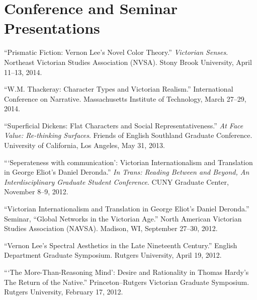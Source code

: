 \documentclass[10pt,letterpaper]{article}
\renewenvironment{itemize}{
  \begin{list}{}{
    \setlength{\leftmargin}{1.5em}
    \setlength{\itemsep}{0.25em}
    \setlength{\parskip}{0pt}
    \setlength{\parsep}{0.25em}
  }
}{
  \end{list}
}
\begin{document}



\section*{Conference and Seminar Presentations}

\begin{itemize}

\item ``Prismatic Fiction: Vernon Lee's Novel Color Theory.'' \emph{Victorian Senses}. Northeast Victorian Studies Association (NVSA). Stony Brook University, April 11--13, 2014.
\item ``W.M. Thackeray: Character Types and Victorian Realism.'' International Conference on Narrative. Massachusetts Institute of Technology, March 27--29, 2014.
\item ``Superficial Dickens: Flat Characters and Social Representativeness.'' \emph{At Face Value: Re-thinking Surfaces}. Friends of English Southland Graduate Conference. University of California, Los Angeles, May 31, 2013.
\item ```Seperateness with communication': Victorian Internationalism and Translation in George Eliot's Daniel Deronda.'' \emph{In Trans: Reading Between and Beyond, An Interdisciplinary Graduate Student Conference}. CUNY Graduate Center, November 8--9, 2012.
\item ``Victorian Internationalism and Translation in George Eliot's Daniel Deronda.'' Seminar, ``Global Networks in the Victorian Age.'' North American Victorian Studies Association (NAVSA). Madison, WI, September 27--30, 2012.
\item ``Vernon Lee's Spectral Aesthetics in the Late Nineteenth Century.'' English Department Graduate Symposium. Rutgers University, April 19, 2012.
\item ```The More-Than-Reasoning Mind': Desire and Rationality in Thomas Hardy's The Return of the Native.'' Princeton--Rutgers Victorian Graduate Symposium. Rutgers University, February 17, 2012.

\end{itemize}
\end{document}
